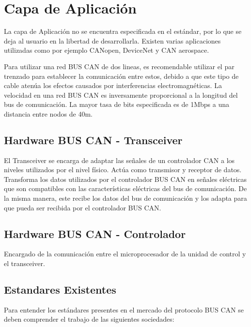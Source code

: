 \section {Capa de Aplicación}

La capa de Aplicación no se encuentra especificada en el estándar, por lo que se deja al usuario en la libertad de desarrollarla.
Existen varias aplicaciones utilizadas como por ejemplo CANopen, DeviceNet y CAN aerospace. 

Para utilizar una red BUS CAN de dos lineas, es recomendable utilizar el par trenzado para establecer la comunicación entre estos, debido a que este tipo de cable atenúa los efectos causados por interferencias electromagnéticas. 
La velocidad en una red  BUS CAN es inversamente proporcional a la longitud del bus de comunicación. La mayor tasa de bits especificada es de 1Mbps a una distancia entre nodos de 40m. 


\subsection {Hardware BUS CAN - Transceiver}

El Transceiver se encarga de adaptar las señales de un controlador CAN  a los niveles utilizados por el nivel físico. Actúa como transmisor y receptor de datos. Transforma los datos utilizados por el controlador BUS CAN en señales eléctricas que son compatibles con las características eléctricas del bus de comunicación. De la misma manera, este recibe los datos del bus de comunicación y los adapta para que pueda ser recibida por el controlador BUS CAN.

\subsection {Hardware BUS CAN - Controlador}

Encargado de la comunicación entre el microprocesador de la unidad de control y el transceiver. 
 
\subsection{Estandares Existentes}

Para entender los estándares presentes en el mercado del protocolo BUS CAN se deben comprender el trabajo de las siguientes sociedades:

